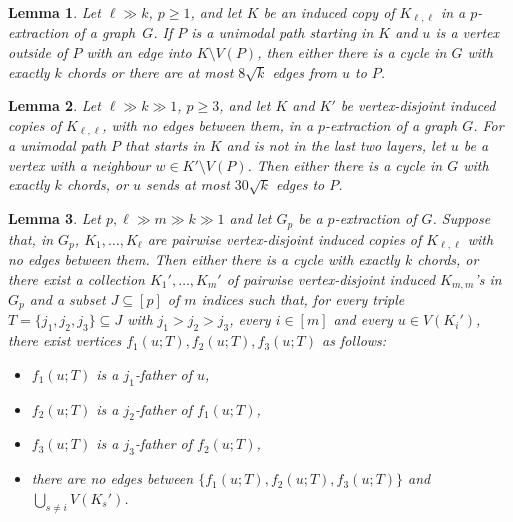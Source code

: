 \documentclass[10pt,a4paper]{amsart}
\theoremstyle{plain}
\newtheorem{lem}{Lemma}
\theoremstyle{definition}
\begin{document}
	\begin{lem}\label{lem:sqrtk-same-Kll}
	    Let $\ell \gg k$, $p \ge 1$, and let $K$ be an induced copy of $K_{\ell, \ell}$ in a $p$-extraction of a graph~$G$.
	    If $P$ is a unimodal path starting in $K$ and $u$ is a vertex outside of $P$ with an edge into $K \setminus V(P)$, then either there is a cycle in $G$ with exactly $k$ chords or there are at most $8\sqrt k$ edges from $u$ to $P$.
	\end{lem}

    \begin{lem} \label{lem:sqrtk-different-Kll}
        Let $\ell \gg k \gg 1$, $p \ge 3$, and let
        $K$ and $K'$ be vertex-disjoint induced copies of $K_{\ell, \ell}$, with no edges between them, in a $p$-extraction of a graph $G$.
        For a unimodal path $P$ that starts in $K$ and is not in the last two layers, let $u$ be a vertex with a neighbour $w \in K' \setminus V(P)$. Then either there is a cycle in $G$ with exactly $k$ chords, or $u$ sends at most $30\sqrt{k}$ edges to $P$.
    \end{lem}

        \begin{lem} \label{lem:cleaning-step-one}
            Let $p, \ell \gg m \gg k \gg 1$ and let $G_p$ be a $p$-extraction of $G$. %
            Suppose that, in $G_p$, $K_1, \ldots, K_{\ell}$ are pairwise vertex-disjoint induced copies of $K_{\ell, \ell}$ with no edges between them. Then either there is a cycle with exactly $k$ chords, or there exist a collection $K_1', \ldots, K_m'$ of pairwise vertex-disjoint induced $K_{m, m}$'s in $G_p$ and a subset $J \subseteq [p]$ of $m$ indices such that, for every triple $T=\{j_1, j_2, j_3\} \subseteq J$ with $j_1 > j_2 > j_3$, every $i \in [m]$ and every $u \in V(K_i')$, there exist vertices $f_{1}(u;T), f_{2}(u;T), f_{3}(u;T)$ as follows:
            \begin{itemize}
                \item $f_{1}(u;T)$ is a $j_1$-father of $u$, 
                \item $f_{2}(u;T)$ is a $j_2$-father of $f_{1}(u;T)$,
                \item $f_{3}(u;T)$ is a $j_3$-father of $f_{2}(u;T)$,
                \item there are no edges between $\{f_{1}(u;T),f_{2}(u;T),f_{3}(u;T)\}$ and $\bigcup_{s \neq i}V(K_{s}')$. 
            \end{itemize}
        \end{lem}
\end{document}
